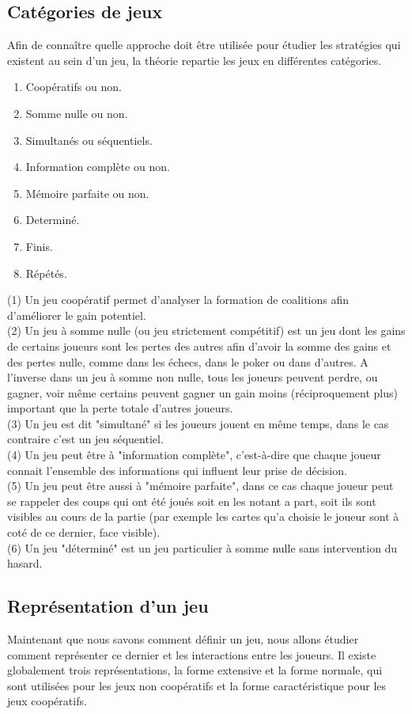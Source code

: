 \documentclass[12pt]{article}
\begin{document}
	\subsection{Catégories de jeux}
    	Afin de connaître quelle approche doit être utilisée pour étudier les stratégies qui existent au sein d'un jeu, la théorie repartie les jeux en différentes catégories\cite{wiki_typo_theorie_jeux}.
    	\begin{enumerate}
    		\item Coopératifs ou non.
    		\item Somme nulle ou non.
    		\item Simultanés ou séquentiels.
    		\item Information complète ou non.
    		\item Mémoire parfaite ou non.
    		\item Determiné.
    		\item Finis.
    		\item Répétés.
    	\end{enumerate}
    	(1) Un jeu coopératif permet d'analyser la formation de coalitions afin d'améliorer le gain potentiel. \\
    	(2) Un jeu à somme nulle (ou jeu strictement compétitif) est un jeu dont les gains de certains joueurs sont les pertes des autres afin d'avoir la somme des gains et des pertes nulle, comme dans les échecs, dans le poker ou dans d'autres. A l'inverse dans un jeu à somme non nulle, tous les joueurs peuvent perdre, ou gagner, voir même certains peuvent gagner un gain moins (réciproquement plus) important que la perte totale d'autres joueurs.\\
    	(3) Un jeu est dit "simultané" si les joueurs jouent en même temps, dans le cas contraire c'est un jeu séquentiel.\\
    	(4) Un jeu peut être à "information complète", c'est-à-dire que chaque joueur connait l'ensemble des informations qui influent leur prise de décision.\\
    	(5) Un jeu peut être aussi à "mémoire parfaite", dans ce cas chaque joueur peut se rappeler des coups qui ont été joués soit en les notant a part, soit ils sont visibles au cours de la partie (par exemple les cartes qu'a choisie le joueur sont à coté de ce dernier, face visible).\\
    	(6) Un jeu "déterminé" est un jeu particulier à somme nulle sans intervention du hasard.

	\subsection{Représentation d'un jeu}
    	Maintenant que nous savons comment définir un jeu, nous allons étudier comment représenter ce dernier et les interactions entre les joueurs. Il existe globalement trois représentations\cite{wiki_representation_theorie_jeux}, la forme extensive et la forme normale, qui sont utilisées pour les jeux non coopératifs et la forme caractéristique pour les jeux coopératifs.
\end{document}

